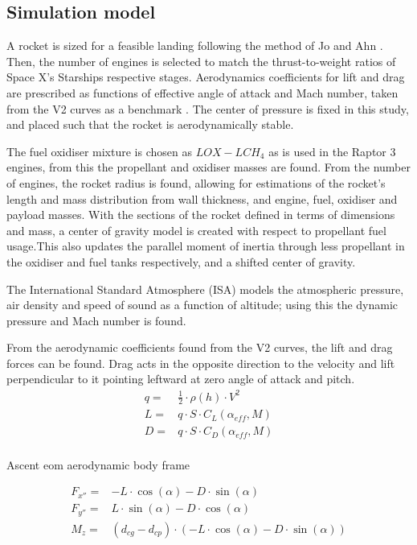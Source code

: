 \subsection{Simulation model}

A rocket is sized for a feasible landing following the method of Jo and Ahn \cite{ReusbaleStaging}. Then, the number of engines is selected to match the thrust-to-weight ratios of Space X's Starships respective stages. Aerodynamics coefficients for lift and drag are prescribed as functions of effective angle of attack and Mach number, taken from the V2 curves as a benchmark \cite{sutton_rocket_2016}. The center of pressure is fixed in this study, and placed such that the rocket is aerodynamically stable.

The fuel oxidiser mixture is chosen as $LOX-LCH_4$ as is used in the Raptor 3 engines, from this the propellant and oxidiser masses are found. From the number of engines, the rocket radius is found, allowing for estimations of the rocket's length and mass distribution from wall thickness, and engine, fuel, oxidiser and payload masses. With the sections of the rocket defined in terms of dimensions and mass, a center of gravity model is created with respect to propellant fuel usage.This also updates the parallel moment of inertia through less propellant in the oxidiser and fuel tanks respectively, and a shifted center of gravity.

The International Standard Atmosphere (ISA) models the atmospheric pressure, air density and speed of sound as a function of altitude; using this the dynamic pressure and Mach number is found.
 
 From the aerodynamic coefficients found from the V2 curves, the lift and drag forces can be found. Drag acts in the opposite direction to the velocity and lift perpendicular to it pointing leftward at zero angle of attack and pitch.
\begin{equation}
\begin{aligned}
    q =& \frac{1}{2} \cdot \rho(h) \cdot V^2\\
    L =& q \cdot S \cdot C_L(\alpha_{eff}, M) \\
    D =& q \cdot S \cdot C_D(\alpha_{eff}, M) \\
\end{aligned}

\end{equation}

Ascent eom aerodynamic body frame

\begin{equation}
\begin{aligned}
    F_{x''} =& -L \cdot \cos(\alpha) -D\cdot\sin(\alpha) \\
    F_{y''} =& L \cdot \sin(\alpha) - D \cdot \cos(\alpha) \\
    M_z =& (d_{cg} - d_{cp}) \cdot ( -L \cdot \cos(\alpha) -D\cdot\sin(\alpha))
\end{aligned}
\end{equation}

